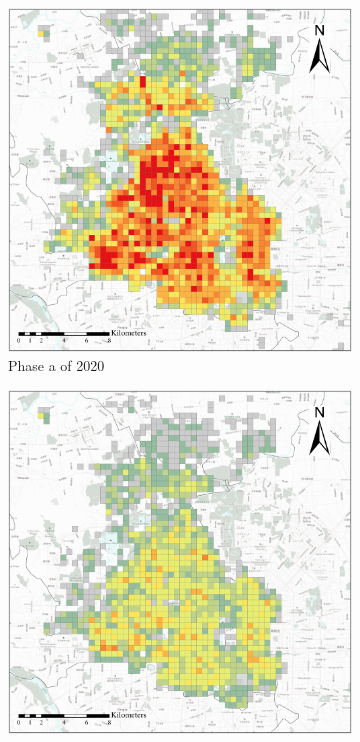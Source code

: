 \documentclass[preprints,ijgi,submit,moreauthors]{Definitions/mdpi}
\begin{document}
\begin{figure}[ht]
    \centering
    \begin{subfigure}{.3\textwidth}
        \includegraphics[width=\textwidth]{Figures/BSSPhase1_2020.eps}
        \caption{Phase a of 2020}
    \end{subfigure}
    \begin{subfigure}{.3\textwidth}
        \includegraphics[width=\textwidth]{Figures/BSSPhase2_2020.eps}

\end{subfigure}
\end{figure}
\end{document}
